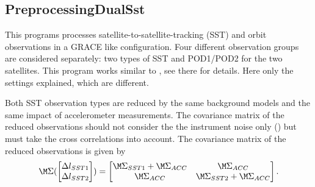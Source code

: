 \subsection{PreprocessingDualSst}\label{PreprocessingDualSst}
This programs processes satellite-to-satellite-tracking (SST) and orbit observations in a GRACE like configuration.
Four different observation groups are considered separately: two types of SST and POD1/POD2 for the two satellites.
This program works similar to , see there for details. Here only the settings explained,
which are different.

Both SST observation types are reduced by the same background models and the same impact
of accelerometer measurements. The covariance matrix of the reduced observations should not consider
the the instrument noise only () but must
take the cross correlations  into account.
The covariance matrix of the reduced observations is given by
\begin{equation}
  \M\Sigma(\begin{bmatrix} \Delta l_{SST1} \\ \Delta l_{SST2} \end{bmatrix})
  = \begin{bmatrix} \M\Sigma_{SST1} + \M\Sigma_{ACC} & \M\Sigma_{ACC} \\
                   \M\Sigma_{ACC} & \M\Sigma_{SST2} + \M\Sigma_{ACC}
    \end{bmatrix}.
\end{equation}


